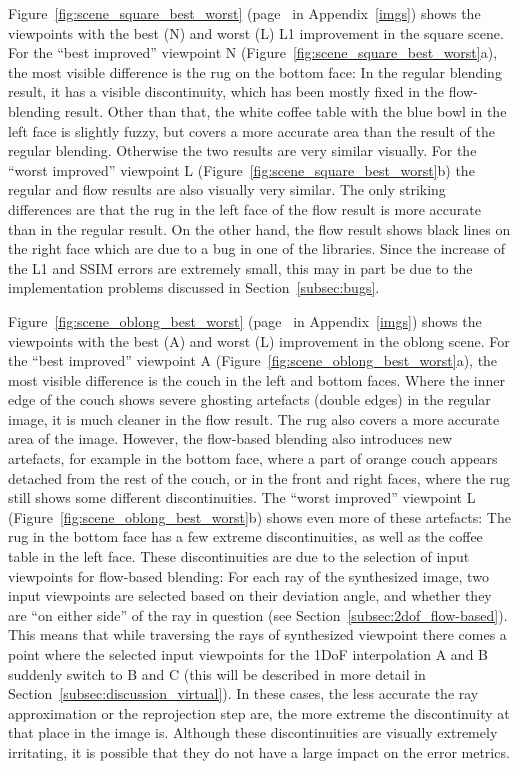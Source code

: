 Figure~\ref{fig:scene_square_best_worst} (page~\pageref{fig:scene_square_best_worst} in Appendix~\ref{imgs}) shows the viewpoints with the best (N) and worst (L) L1 improvement in the square scene. For the ``best improved'' viewpoint N (Figure~\ref{fig:scene_square_best_worst}a), the most visible difference is the rug on the bottom face: In the regular blending result, it has a visible discontinuity, which has been mostly fixed in the flow-blending result. Other than that, the white coffee table with the blue bowl in the left face is slightly fuzzy, but covers a more accurate area than the result of the regular blending. Otherwise the two results are very similar visually.
For the ``worst improved'' viewpoint L (Figure~\ref{fig:scene_square_best_worst}b) the regular and flow results are also visually very similar. The only striking differences are that the rug in the left face of the flow result is more accurate than in the regular result. On the other hand, the flow result shows black lines on the right face which are due to a bug in one of the libraries. Since the increase of the L1 and SSIM errors are extremely small, this may in part be due to the implementation problems discussed in Section~\ref{subsec:bugs}.

Figure~\ref{fig:scene_oblong_best_worst} (page~\pageref{fig:scene_oblong_best_worst} in Appendix~\ref{imgs}) shows the viewpoints with the best (A) and worst (L) improvement in the oblong scene. For the ``best improved'' viewpoint A (Figure~\ref{fig:scene_oblong_best_worst}a), the most visible difference is the couch in the left and bottom faces. Where the inner edge of the couch shows severe ghosting artefacts (double edges) in the regular image, it is much cleaner in the flow result. The rug also covers a more accurate area of the image. However, the flow-based blending also introduces new artefacts, for example in the bottom face, where a part of orange couch appears detached from the rest of the couch, or in the front and right faces, where the rug still shows some different discontinuities.
The ``worst improved'' viewpoint L (Figure~\ref{fig:scene_oblong_best_worst}b) shows even more of these artefacts: The rug in the bottom face has a few extreme discontinuities, as well as the coffee table in the left face. These discontinuities are due to the selection of input viewpoints for flow-based blending: For each ray of the synthesized image, two input viewpoints are selected based on their deviation angle, and whether they are ``on either side'' of the ray in question (see Section~\ref{subsec:2dof_flow-based}). This means that while traversing the rays of synthesized viewpoint there comes a point where the selected input viewpoints for the 1DoF interpolation A and B suddenly switch to B and C (this will be described in more detail in Section~\ref{subsec:discussion_virtual}). In these cases, the less accurate the ray approximation or the reprojection step are, the more extreme the discontinuity at that place in the image is. Although these discontinuities are visually extremely irritating, it is possible that they do not have a large impact on the error metrics.

